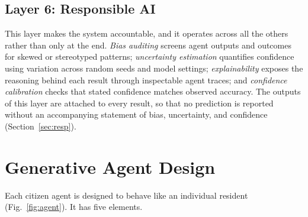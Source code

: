 \documentclass[conference]{IEEEtran}
\begin{document}
\subsection{Layer 6: Responsible AI}
This layer makes the system accountable, and it operates across all the others rather than only at the end. \emph{Bias auditing} screens agent outputs and outcomes for skewed or stereotyped patterns; \emph{uncertainty estimation} quantifies confidence using variation across random seeds and model settings; \emph{explainability} exposes the reasoning behind each result through inspectable agent traces; and \emph{confidence calibration} checks that stated confidence matches observed accuracy. The outputs of this layer are attached to every result, so that no prediction is reported without an accompanying statement of bias, uncertainty, and confidence (Section~\ref{sec:resp}).

\section{Generative Agent Design}
\label{sec:agent}

Each citizen agent is designed to behave like an individual resident (Fig.~\ref{fig:agent}). It has five elements.
\end{document}
